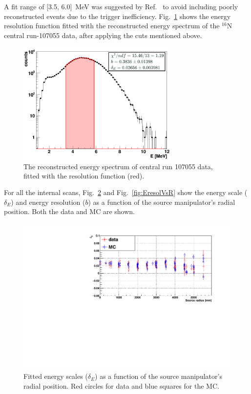 A fit range of [3.5, 6.0]~MeV was suggested by Ref.~\cite{waterunidoc} to avoid including poorly reconstructed events due to the trigger inefficiency. Fig.~\ref{fittedEnergyResol} shows the energy resolution function fitted with the reconstructed energy spectrum of the $^{16}$N central run-107055 data, after applying the cuts mentioned above.
\begin{figure}
	\centering
	\includegraphics[width=8cm]{N16data_energy_fitted_107055.png}
	\caption[The reconstructed energy spectrum fitted with resolution function.]{The reconstructed energy spectrum of central run 107055 data, fitted with the resolution function (red).\label{fittedEnergyResol}}
\end{figure}

For all the internal scans, Fig.~\ref{fig:EscaleVsR} and Fig.~\ref{fig:EresolVsR} show the energy scale ($\delta_E$) and energy resolution ($b$) as a function of the source manipulator's radial position. Both the data and MC are shown.
\begin{figure}
	\centering
    \includegraphics[width=12cm]{EscaleVsSrcRadius.pdf}
	\caption[Fitted energy scales as a function of the source manipulator's radial position.]{Fitted energy scales ($\delta_E$) as a function of the source manipulator's radial position. Red circles for data and blue squares for the MC.	\label{fig:EscaleVsR}}
\end{figure}


